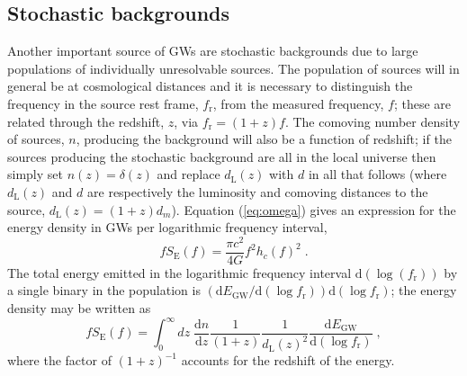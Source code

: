 \subsection{Stochastic backgrounds}\label{sec:stoch}
Another important source of GWs are stochastic backgrounds due to large populations of individually unresolvable sources. The population of sources will in general be at cosmological distances and it is necessary to distinguish the frequency in the source rest frame, $f_{\textrm{r}}$, from the measured frequency, $f$; these are related through the redshift, $z$, via $f_{\textrm{r}}=(1+z)f$. The comoving number density of sources, $n$, producing the background will also be a function of redshift; if the sources producing the stochastic background are all in the local universe then simply set $n(z)=\delta (z)$ and replace $d_{\textrm{L}}(z)$ with $d$ in all that follows (where $d_{\textrm{L}}(z)$ and $d$ are respectively the luminosity and comoving distances to the source, $d_{\textrm{L}}(z)=(1+z)d_{m}$). Equation (\ref{eq:omega}) gives an expression for the energy density in GWs per logarithmic frequency interval,
\begin{equation}\label{eq:stoch} fS_{\textrm{E}}(f)=\frac{\pi c^{2}}{4G}f^{2}h_{c}(f)^{2} \; . \end{equation}
The total energy emitted in the logarithmic frequency interval $\textrm{d}\left(\log (f_{\textrm{r}})\right)$ by a single binary in the population is $\left(\textrm{d}E_{\textrm{GW}}/\textrm{d}(\log f_{\textrm{r}})\right)\textrm{d}(\log f_{\textrm{r}})$; the energy density may be written as
\begin{equation}\label{eq:Phinney} fS_{\textrm{E}}(f)=\int_{0}^{\infty}dz\; \frac{\textrm{d}n}{\textrm{d}z}\frac{1}{(1+z)}\frac{1}{d_{\textrm{L}}(z)^{2}}\frac{\textrm{d}E_{\textrm{GW}}}{\textrm{d}\left(\log f_{\textrm{r}} \right)} \; , \end{equation}
where the factor of $\left( 1+z \right)^{-1}$ accounts for the redshift of the energy.

